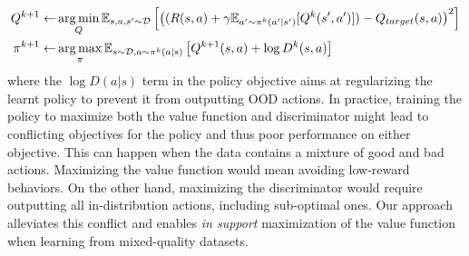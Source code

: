 \begin{align}
\begin{split}
\label{eq:brac_update}
    Q^{k+1} \leftarrow& \operatorname*{arg\,min}_{Q} \mathbb{E}_{s, a, s' \sim \mathcal{D}}\left[ \left((R(s, a) +  \gamma \mathbb{E}_{a' \sim {\pi}^k(a'|s')}[Q^{k}(s', a')]) - Q_{target}(s, a)\right)^2 \right]\\ 
    \pi^{k+1} \leftarrow& \operatorname*{arg\,max}_{\pi} \mathbb{E}_{s \sim \mathcal{D}, a \sim \pi^k(a|s)}\left[Q^{k+1}(s, a) + \log D^k(s,a) \right]
\end{split}
\end{align}
where the $\log D(a|s)$ term in the policy objective aims at regularizing the learnt policy to prevent it from outputting OOD actions. In practice, training the policy to maximize both the value function and discriminator might lead to conflicting objectives for the policy and thus poor performance on either objective.
This can happen when the data contains a mixture of good and bad actions. Maximizing the value function would mean avoiding low-reward behaviors. On the other hand, maximizing the discriminator would require outputting all in-distribution actions, including sub-optimal ones. Our approach alleviates this conflict and enables \textit{in support} maximization of the value function when learning from mixed-quality datasets.




